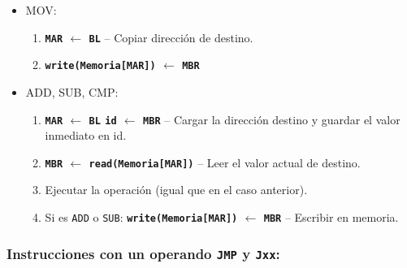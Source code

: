 \documentclass[12pt,oneside]{templates/unerthesis}
\providecommand{\tightlist}{%
  \setlength{\itemsep}{0pt}\setlength{\parskip}{0pt}}
\begin{document}
\begin{itemize}
\begin{itemize}
    \begin{itemize}
    \tightlist
    \item
      MOV:

      \begin{enumerate}
      \def\labelenumi{\arabic{enumi}.}
      \setcounter{enumi}{5}
      \tightlist
      \item
        \textbf{\texttt{MAR} \(\leftarrow\) \texttt{BL}} -- Copiar dirección de destino.
      \item
        \textbf{\texttt{write(Memoria{[}MAR{]})} \(\leftarrow\) \texttt{MBR}}
      \end{enumerate}
    \item
      ADD, SUB, CMP:

      \begin{enumerate}
      \def\labelenumi{\arabic{enumi}.}
      \setcounter{enumi}{5}
      \tightlist
      \item
        \textbf{\texttt{MAR} \(\leftarrow\) \texttt{BL} \textbar{} \texttt{id} \(\leftarrow\) \texttt{MBR}} -- Cargar la dirección destino y guardar el valor inmediato en id.
      \item
        \textbf{\texttt{MBR} \(\leftarrow\) \texttt{read(Memoria{[}MAR{]})}} -- Leer el valor actual de destino.
      \item
        Ejecutar la operación (igual que en el caso anterior).
      \item
        Si es \texttt{ADD} o \texttt{SUB}: \textbf{\texttt{write(Memoria{[}MAR{]})} \(\leftarrow\) \texttt{MBR}} -- Escribir en memoria.
      \end{enumerate}
    \end{itemize}
  \end{itemize}
\end{itemize}

\hypertarget{instrucciones-con-un-operando-jmp-y-jxx}{%
\subsubsection{\texorpdfstring{Instrucciones con un operando \texttt{JMP} y \texttt{Jxx}:}{Instrucciones con un operando JMP y Jxx:}}\label{instrucciones-con-un-operando-jmp-y-jxx}}
\end{document}
